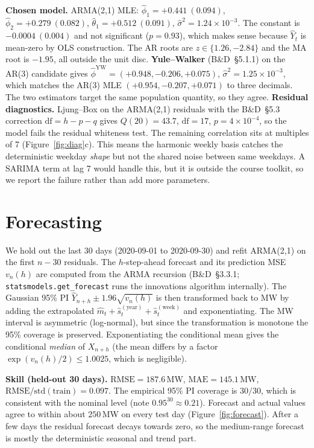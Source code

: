 \documentclass[11pt,a4paper]{article}
\begin{document}
\textbf{Chosen model.} ARMA(2,1) MLE: $\hat\phi_1 = +0.441~(0.094)$,
$\hat\phi_2 = +0.279~(0.082)$, $\hat\theta_1 = +0.512~(0.091)$,
$\hat\sigma^2 = 1.24\!\times\!10^{-3}$. The constant is $-0.0004~(0.004)$ and
not significant ($p = 0.93$), which makes sense because $\hat Y_t$ is
mean-zero by OLS construction. The AR roots are $z \in \{1.26, -2.84\}$ and
the MA root is $-1.95$, all outside the unit disc.
\textbf{Yule--Walker} (B\&D~\S5.1.1) on the AR(3) candidate gives
$\hat\phi^{\mathrm{YW}} = (+0.948, -0.206, +0.075)$,
$\hat\sigma^2 = 1.25\!\times\!10^{-3}$, which matches the AR(3) MLE
$(+0.954, -0.207, +0.071)$ to three decimals. The two estimators target the
same population quantity, so they agree.
\textbf{Residual diagnostics.} Ljung--Box on the ARMA(2,1) residuals with the
B\&D~\S5.3 correction $\mathrm{df} = h - p - q$ gives $Q(20) = 43.7$,
$\mathrm{df}=17$, $p = 4\!\times\!10^{-4}$, so the model fails the residual
whiteness test. The remaining correlation sits at multiples of 7
(Figure~\ref{fig:diag}c). This means the harmonic weekly basis catches the
deterministic weekday \emph{shape} but not the shared noise between same
weekdays. A SARIMA term at lag 7 would handle this, but it is outside the
course toolkit, so we report the failure rather than add more parameters.

\section{Forecasting}
We hold out the last 30 days (2020-09-01 to 2020-09-30) and refit ARMA(2,1)
on the first $n-30$ residuals. The $h$-step-ahead forecast and its prediction
MSE $v_n(h)$ are computed from the ARMA recursion (B\&D~\S3.3.1;
\texttt{statsmodels.get\_forecast} runs the innovations algorithm internally).
The Gaussian 95\% PI $\hat Y_{n+h} \pm 1.96\sqrt{v_n(h)}$ is then transformed
back to MW by adding the extrapolated $\hat m_t + \hat s_t^{(\mathrm{year})}
+ \hat s_t^{(\mathrm{week})}$ and exponentiating. The MW interval is
asymmetric (log-normal), but since the transformation is monotone the 95\%
coverage is preserved. Exponentiating the conditional mean gives the
conditional \emph{median} of $X_{n+h}$ (the mean differs by a factor
$\exp(v_n(h)/2) \leq 1.0025$, which is negligible).

\textbf{Skill (held-out 30 days).}
$\mathrm{RMSE} = 187.6$\,MW, $\mathrm{MAE} = 145.1$\,MW,
$\mathrm{RMSE}/\mathrm{std}(\mathrm{train}) = 0.097$. The empirical 95\% PI
coverage is $30/30$, which is consistent with the nominal level (note
$0.95^{30} \approx 0.21$). Forecast and actual values agree to within about
$250$\,MW on every test day (Figure~\ref{fig:forecast}). After a few days
the residual forecast decays towards zero, so the medium-range forecast is
mostly the deterministic seasonal and trend part.
\end{document}
